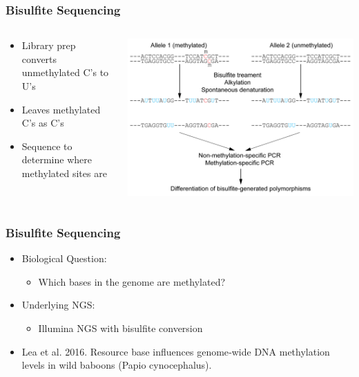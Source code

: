 \documentclass[14pt]{beamer}
\begin{document}
\begin{frame}
\frametitle{Bisulfite Sequencing}
\begin{columns}
	\begin{column}{0.4\textwidth}
		\begin{itemize}
			\item<+-> Library prep converts unmethylated C's to U's
			\item<+-> Leaves methylated C's as C's
			\item<+-> Sequence to determine where methylated sites are
		\end{itemize}
		\end{column}
	\begin{column}{0.6\textwidth}
		\begin{center}
     		\includegraphics[width=1\textwidth]{images_20170926_bisulfite.png}
     	\end{center}
	\end{column}
\end{columns}
\end{frame}

\begin{frame}
\frametitle{Bisulfite Sequencing}
\begin{itemize}
	\item<+-> Biological Question:
	\begin{itemize}
		\item<+-> Which bases in the genome are methylated?
	\end{itemize}
	\item<+-> Underlying NGS:
	\begin{itemize}
		\item<+-> Illumina NGS with bisulfite conversion
	\end{itemize}
	\item<+-> Lea et al. 2016. Resource base influences genome‐wide DNA methylation levels in wild baboons (Papio cynocephalus).
\end{itemize}
\end{frame}
\end{document}
